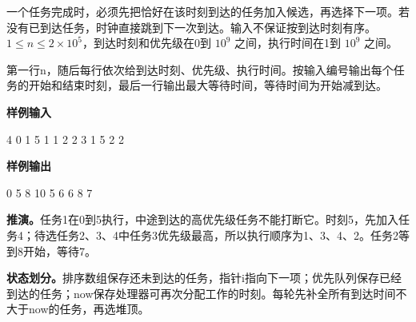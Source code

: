 \documentclass[UTF8,11pt,a4paper,fontset=none]{ctexart}
\begin{document}
一个任务完成时，必须先把恰好在该时刻到达的任务加入候选，再选择下一项。若没有已到达任务，时钟直接跳到下一次到达。输入不保证按到达时刻有序。$1\le n\le2\times10^5$，到达时刻和优先级在0到 $10^9$ 之间，执行时间在1到 $10^9$ 之间。

第一行n，随后每行依次给到达时刻、优先级、执行时间。按输入编号输出每个任务的开始和结束时刻，最后一行输出最大等待时间，等待时间为开始减到达。
\begin{tcolorbox}[samplebox,title={输入输出样例}]
\textbf{样例输入}
\begin{Sample}
4
0 1 5
1 1 2
2 3 1
5 2 2
\end{Sample}
\tcblower
\textbf{样例输出}
\begin{Sample}
0 5
8 10
5 6
6 8
7
\end{Sample}
\end{tcolorbox}

\noindent\textbf{推演。}任务1在0到5执行，中途到达的高优先级任务不能打断它。时刻5，先加入任务4；待选任务2、3、4中任务3优先级最高，所以执行顺序为1、3、4、2。任务2等到8开始，等待7。

\noindent\textbf{状态划分。}排序数组保存还未到达的任务，指针i指向下一项；优先队列保存已经到达的任务；now保存处理器可再次分配工作的时刻。每轮先补全所有到达时间不大于now的任务，再选堆顶。
\end{document}
